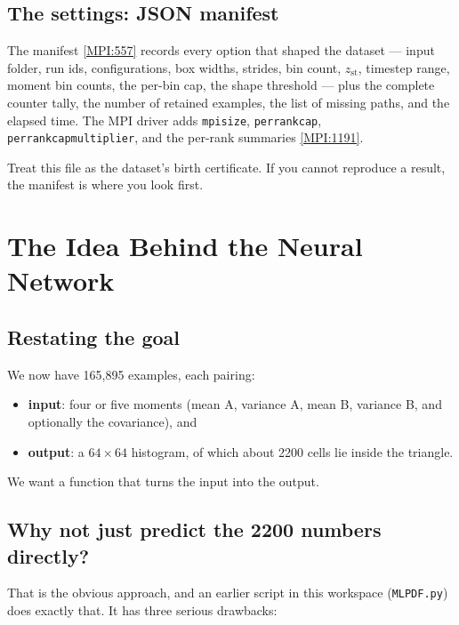 \documentclass[11pt,a4paper]{report}
\newcommand{\srcbase}{vscode://file/Users/syellapa/Documents/Research/2026/ANSYS/Multi-ScalarPDF}
\newcommand{\srctag}[1]{{\footnotesize\textcolor{TagGray}{[#1]}}}
\newcommand{\MpiL}[1]{\href{\srcbase/EnsightPDFHybridDatasetMPI.py:#1}{\srctag{MPI:#1}}}
\newcommand{\code}[1]{\texttt{#1}}
\renewcommand{\_}{\origtextunderscore\allowbreak}
\begin{document}
\section{The settings: JSON manifest}

The manifest \MpiL{557} records every option that shaped the dataset --- input folder, run
ids, configurations, box widths, strides, bin count, $z_{\text{st}}$, timestep range, moment
bin counts, the per-bin cap, the shape threshold --- plus the complete counter tally, the
number of retained examples, the list of missing paths, and the elapsed time. The MPI driver
adds \code{mpi\_size}, \code{per\_rank\_cap}, \code{per\_rank\_cap\_multiplier}, and the
per-rank summaries \MpiL{1191}.

Treat this file as the dataset's birth certificate. If you cannot reproduce a result, the
manifest is where you look first.

\chapter{The Idea Behind the Neural Network}
\label{ch:mdn-idea}

\section{Restating the goal}

We now have 165{,}895 examples, each pairing:
\begin{itemize}
  \item \textbf{input}: four or five moments (mean A, variance A, mean B, variance B, and
        optionally the covariance), and
  \item \textbf{output}: a $64\times64$ histogram, of which about 2200 cells lie inside the
        triangle.
\end{itemize}

We want a function that turns the input into the output.

\section{Why not just predict the 2200 numbers directly?}

That is the obvious approach, and an earlier script in this workspace (\code{MLPDF.py}) does
exactly that. It has three serious drawbacks:
\end{document}
